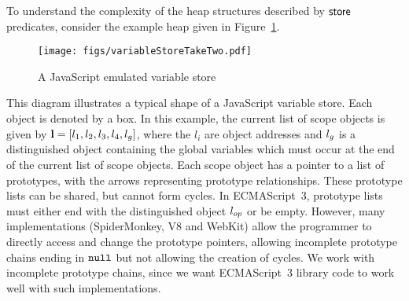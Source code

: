 \documentclass{article}
\begin{document}
To understand the complexity of the heap structures described by  $\mathsf{store}$ predicates, consider  the  example heap given in 
Figure~\ref{fig:variableStore}.
%
\begin{figure}
      \begin{center}
                \texttt{[image: figs/variableStoreTakeTwo.pdf]}
        \end{center}
        \caption{A JavaScript emulated variable store}
        \label{fig:variableStore}
\end{figure}
\noindent This diagram illustrates a typical shape of a %
JavaScript variable store. Each object is denoted by a  box.
In this example, the current list of scope objects is given by $\textbf{l} =
[l_1, l_2, l_3, l_4, l_g]$, where the  $l_i$  are object addresses
and $l_g$ is a distinguished object containing the global variables which must occur  at the end of the current list of scope objects.
Each scope  object has a pointer to a list of prototypes, with the
arrows representing prototype relationships. These prototype lists can
be shared, but cannot form cycles. In ECMAScript~3, prototype lists must either end with the distinguished object $l_{op}$ or  be empty. %
 However, many implementations (SpiderMonkey, V8 and
WebKit) allow the programmer to directly access and change the
prototype pointers,  allowing incomplete prototype chains ending in $\mbox{\texttt{{\upshape null}}}$ but not allowing  the creation of cycles. We work with 
incomplete prototype chains, since we want ECMAScript~3  library code to work well with  such implementations. 

\end{document}
